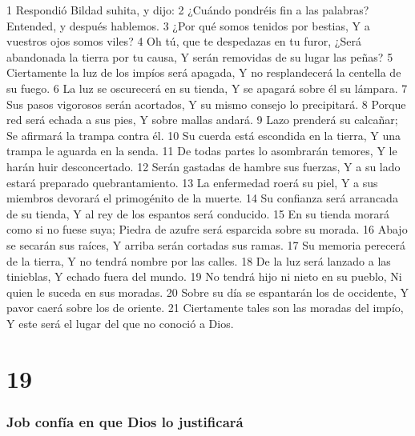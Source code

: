 1 Respondió Bildad suhita, y dijo:  
2 ¿Cuándo pondréis fin a las palabras?  
Entended, y después hablemos.  
3 ¿Por qué somos tenidos por bestias,  
Y a vuestros ojos somos viles?  
4 Oh tú, que te despedazas en tu furor,  
¿Será abandonada la tierra por tu causa,  
Y serán removidas de su lugar las peñas? 
5 Ciertamente la luz de los impíos será apagada,  
Y no resplandecerá la centella de su fuego.  
6 La luz se oscurecerá en su tienda,  
Y se apagará sobre él su lámpara.  
7 Sus pasos vigorosos serán acortados,  
Y su mismo consejo lo precipitará.  
8 Porque red será echada a sus pies,  
Y sobre mallas andará.  
9 Lazo prenderá su calcañar;  
Se afirmará la trampa contra él.  
10 Su cuerda está escondida en la tierra,  
Y una trampa le aguarda en la senda.  
11 De todas partes lo asombrarán temores,  
Y le harán huir desconcertado.  
12 Serán gastadas de hambre sus fuerzas,  
Y a su lado estará preparado quebrantamiento.  
13 La enfermedad roerá su piel,  
Y a sus miembros devorará el primogénito de la muerte.  
14 Su confianza será arrancada de su tienda,  
Y al rey de los espantos será conducido.  
15 En su tienda morará como si no fuese suya;  
Piedra de azufre será esparcida sobre su morada.  
16 Abajo se secarán sus raíces,  
Y arriba serán cortadas sus ramas.  
17 Su memoria perecerá de la tierra,  
Y no tendrá nombre por las calles.  
18 De la luz será lanzado a las tinieblas,  
Y echado fuera del mundo.  
19 No tendrá hijo ni nieto en su pueblo,  
Ni quien le suceda en sus moradas.  
20 Sobre su día se espantarán los de occidente,  
Y pavor caerá sobre los de oriente.  
21 Ciertamente tales son las moradas del impío,  
Y este será el lugar del que no conoció a Dios.  

\chapter{19}

\subsection*{Job confía en que Dios lo justificará}  

